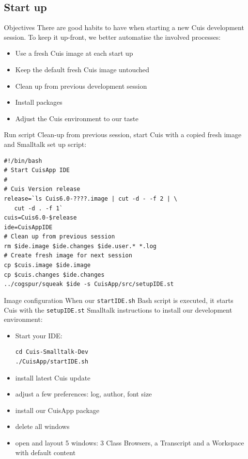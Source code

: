 \documentclass{beamer}
\begin{document}
\subsection{Start up }
\begin{frame}[fragile]{Objectives}
  There are good habits to have when starting a new Cuis development
  session. To keep it up-front, we better automatise the involved
  processes:

  \begin{itemize}
  \item Use a fresh Cuis image at each start up
  \item Keep the default fresh Cuis image untouched
  \item Clean up from previous development session
  \item Install packages
  \item Adjust the Cuis environment to our taste
  \end{itemize}
\end{frame}
%
\begin{frame}[fragile]{Run script}
  \fontsize{10pt}{12pt}\selectfont Clean-up from previous session,
  start Cuis with a copied fresh image and Smalltalk set up script:
  \begin{verbatim}
#!/bin/bash
# Start CuisApp IDE
#
# Cuis Version release
release=`ls Cuis6.0-????.image | cut -d - -f 2 | \
   cut -d . -f 1`
cuis=Cuis6.0-$release
ide=CuisAppIDE
# Clean up from previous session
rm $ide.image $ide.changes $ide.user.* *.log
# Create fresh image for next session
cp $cuis.image $ide.image
cp $cuis.changes $ide.changes
../cogspur/squeak $ide -s CuisApp/src/setupIDE.st   
 \end{verbatim}
\end{frame}
%
\begin{frame}[fragile]{Image configuration}
  When our \texttt{startIDE.sh} Bash script is executed, it starts
  Cuis with the \texttt{setupIDE.st} Smalltalk instructions to install
  our development environment:
  \begin{itemize}
  \item Start your IDE:
\begin{verbatim}
cd Cuis-Smalltalk-Dev
./CuisApp/startIDE.sh
\end{verbatim}
  \item install latest Cuis update
  \item adjust a few preferences: log, author, font size
  \item install our CuisApp package
  \item delete all windows
  \item open and layout 5 windows: 3 Class Browsers, a Transcript and
    a Workspace with default content
  \end{itemize}
\end{frame}
\end{document}

